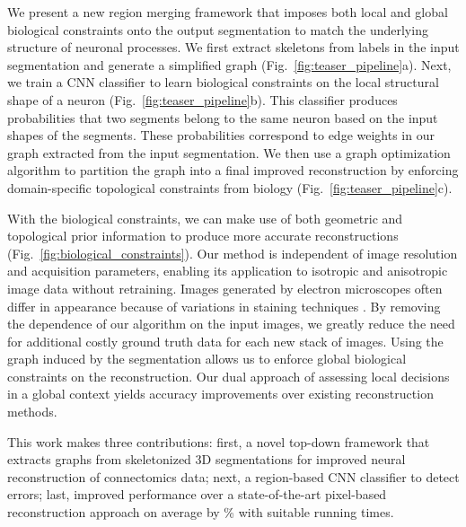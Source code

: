We present a new region merging framework that imposes both local and global biological constraints onto the output segmentation to match the underlying structure of neuronal processes.
We first extract skeletons from labels in the input segmentation and generate a simplified graph (Fig.~\ref{fig:teaser_pipeline}a). 
Next, we train a CNN classifier to learn biological constraints on the local structural shape of a neuron (Fig.~\ref{fig:teaser_pipeline}b).
This classifier produces probabilities that two segments belong to the same neuron based on the input shapes of the segments.
These probabilities correspond to edge weights in our graph extracted from the input segmentation.
We then use a graph optimization algorithm to partition the graph into a final improved reconstruction by enforcing domain-specific topological constraints from biology (Fig.~\ref{fig:teaser_pipeline}c).

With the biological constraints, we can make use of both geometric and topological prior information to produce more accurate reconstructions (Fig.~\ref{fig:biological_constraints}).
Our method is independent of image resolution and acquisition parameters, enabling its application to isotropic and anisotropic image data without retraining.
Images generated by electron microscopes often differ in appearance because of variations in staining techniques \cite{briggman2012volume}.
By removing the dependence of our algorithm on the input images, we greatly reduce the need for additional costly ground truth data for each new stack of images.
Using the graph induced by the segmentation allows us to enforce global biological constraints on the reconstruction. 
Our dual approach of assessing local decisions in a global context yields accuracy improvements over existing reconstruction methods.


This work makes three contributions:
first, a novel top-down framework that extracts graphs from skeletonized 3D segmentations for improved neural reconstruction of connectomics data; 
next, a region-based CNN classifier to detect errors; 
last, improved performance over a state-of-the-art pixel-based reconstruction approach on average by \% with suitable running times.
